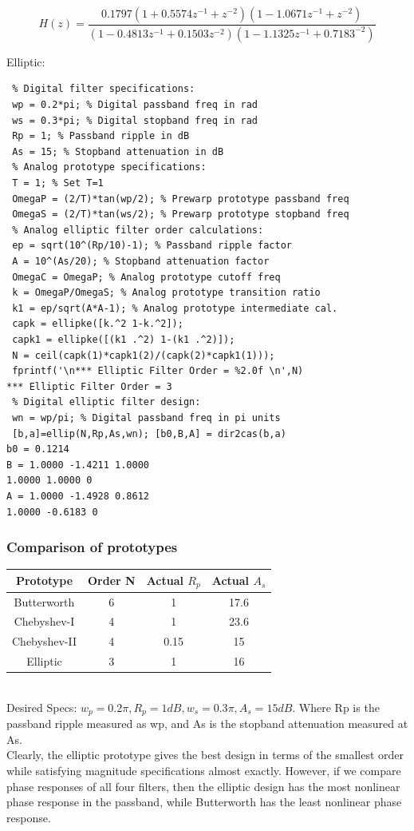 \documentclass{article}
\begin{document}
\begin{center}
    $$H(z)= \frac{0.1797(1+0.5574z^{-1}+z^{-2})(1-1.0671z^{-1}+z^{-2})}{(1-0.4813z^{-1}+0.1503z^{-2})(1-1.1325z^{-1}+0.7183^{-2})}$$
\end{center}
Elliptic: 
\begin{lstlisting}
 % Digital filter specifications:
 wp = 0.2*pi; % Digital passband freq in rad
 ws = 0.3*pi; % Digital stopband freq in rad
 Rp = 1; % Passband ripple in dB
 As = 15; % Stopband attenuation in dB
 % Analog prototype specifications:
 T = 1; % Set T=1
 OmegaP = (2/T)*tan(wp/2); % Prewarp prototype passband freq
 OmegaS = (2/T)*tan(ws/2); % Prewarp prototype stopband freq
 % Analog elliptic filter order calculations:
 ep = sqrt(10^(Rp/10)-1); % Passband ripple factor
 A = 10^(As/20); % Stopband attenuation factor
 OmegaC = OmegaP; % Analog prototype cutoff freq
 k = OmegaP/OmegaS; % Analog prototype transition ratio
 k1 = ep/sqrt(A*A-1); % Analog prototype intermediate cal.
 capk = ellipke([k.^2 1-k.^2]);
 capk1 = ellipke([(k1 .^2) 1-(k1 .^2)]);
 N = ceil(capk(1)*capk1(2)/(capk(2)*capk1(1)));
 fprintf('\n*** Elliptic Filter Order = %2.0f \n',N)
*** Elliptic Filter Order = 3
 % Digital elliptic filter design:
 wn = wp/pi; % Digital passband freq in pi units
 [b,a]=ellip(N,Rp,As,wn); [b0,B,A] = dir2cas(b,a)
b0 = 0.1214
B = 1.0000 -1.4211 1.0000
1.0000 1.0000 0
A = 1.0000 -1.4928 0.8612
1.0000 -0.6183 0    
\end{lstlisting}
\subsubsection{Comparison of prototypes}
\begin{tabular}{|c|c|c|c|}
\hline
\textbf{Prototype} & \textbf{Order N} & \textbf{Actual $R_p$} & \textbf{Actual $A_s$} \\
\hline
Butterworth & 6 & 1 & 17.6\\
\hline
Chebyshev-I & 4 & 1 & 23.6 \\
\hline
Chebyshev-II & 4 & 0.15 & 15 \\
\hline
Elliptic & 3 & 1 & 16 \\
\hline
\end{tabular} \\
\vspace{1em}
Desired Specs: $w_p=0.2\pi,R_p=1dB,w_s=0.3\pi,A_s=15dB$. Where Rp is the passband ripple measured as wp, and As is the stopband attenuation measured at As. \\
\vspace{1em}
Clearly, the elliptic prototype gives the best design in terms of the
smallest order while satisfying magnitude specifications almost exactly.
However, if we compare phase responses of all four filters, then the elliptic design has the most nonlinear phase response in the passband, while
Butterworth has the least nonlinear phase response.
\newpage
\end{document}
